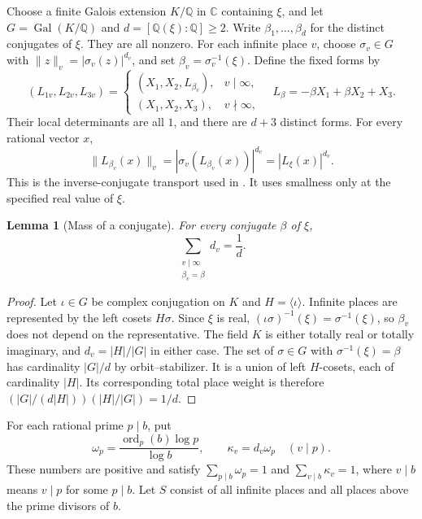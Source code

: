 \documentclass[11pt]{article}
\numberwithin{equation}{section}
\newtheorem{lemma}[theorem]{Lemma}
\theoremstyle{remark}\newtheorem{remark}[theorem]{Remark}
\newcommand{\Q}{\mathbb Q}\newcommand{\Z}{\mathbb Z}
\begin{document}
Choose a finite Galois extension $K/\Q$ in $\mathbb C$ containing
$\xi$, and let $G=\operatorname{Gal}(K/\Q)$ and
$d=[\Q(\xi):\Q]\ge2$. Write $\beta_1,\ldots,\beta_d$ for the distinct
conjugates of $\xi$. They are all nonzero.
For each infinite place $v$, choose $\sigma_v\in G$ with
$\|z\|_v=|\sigma_v(z)|^{d_v}$, and set $\beta_v=\sigma_v^{-1}(\xi)$.
Define the fixed forms by
\begin{equation}\label{eq:forms}
 (L_{1v},L_{2v},L_{3v})=
 \begin{cases}(X_1,X_2,L_{\beta_v}),&v\mid\infty,\\
 (X_1,X_2,X_3),&v\nmid\infty,
 \end{cases}
 \quad L_\beta=-\beta X_1+\beta X_2+X_3.
\end{equation}
Their local determinants are all $1$, and there are $d+3$ distinct forms.
For every rational vector $x$,
\begin{equation}\label{eq:transport}
 \|L_{\beta_v}(x)\|_v
 =|\sigma_v(L_{\beta_v}(x))|^{d_v}=|L_\xi(x)|^{d_v}.
\end{equation}
This is the inverse-conjugate transport used in
\cite[Section~5, equations (5.14)--(5.17)]{BE08}.
It uses smallness only at the specified real value of $\xi$.

\begin{lemma}[Mass of a conjugate]\label{lem:mass}
For every conjugate $\beta$ of $\xi$,
\begin{equation}\label{eq:mass}
 \sum_{\substack{v\mid\infty\\\beta_v=\beta}}d_v=\frac1d.
\end{equation}
\end{lemma}
\begin{proof}
Let $\iota\in G$ be complex conjugation on $K$ and
$H=\langle\iota\rangle$. Infinite places are represented by the left
cosets $H\sigma$. Since $\xi$ is real,
$(\iota\sigma)^{-1}(\xi)=\sigma^{-1}(\xi)$, so $\beta_v$ does not depend
on the representative. The field $K$ is either totally real or totally
imaginary, and $d_v=|H|/|G|$ in either case.
The set of $\sigma\in G$ with $\sigma^{-1}(\xi)=\beta$ has cardinality
$|G|/d$ by orbit--stabilizer. It is a union of left $H$-cosets, each of
cardinality $|H|$. Its corresponding total place weight is therefore
$(|G|/(d|H|))(|H|/|G|)=1/d$.
\end{proof}

For each rational prime $p\mid b$, put
\begin{equation}\label{eq:primeweights}
 \omega_p=\frac{\operatorname{ord}_p(b)\log p}{\log b},\qquad
 \kappa_v=d_v\omega_p\quad(v\mid p).
\end{equation}
These numbers are positive and satisfy
$\sum_{p\mid b}\omega_p=1$ and
$\sum_{v\mid b}\kappa_v=1$, where $v\mid b$ means $v\mid p$ for some
$p\mid b$. Let $S$ consist of all infinite places and all places above
the prime divisors of $b$.
\end{document}
